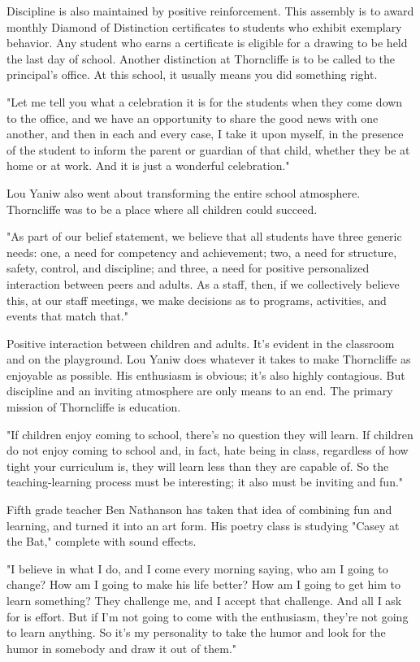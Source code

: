 Discipline is also maintained by positive reinforcement. This assembly is to award monthly Diamond of Distinction certificates to students who exhibit exemplary behavior. Any student who earns a certificate is eligible for a drawing to be held the last day of school. Another distinction at Thorncliffe is to be called to the principal's office. At this school, it usually means you did something right.

"Let me tell you what a celebration it is for the students when they come down to the office, and we have an opportunity to share the good news with one another, and then in each and every case, I take it upon myself, in the presence of the student to inform the parent or guardian of that child, whether they be at home or at work. And it is just a wonderful celebration."

Lou Yaniw also went about transforming the entire school atmosphere. Thorncliffe was to be a place where all children could succeed.

"As part of our belief statement, we believe that all students have three generic needs: one, a need for competency and achievement; two, a need for structure, safety, control, and discipline; and three, a need for positive personalized interaction between peers and adults. As a staff, then, if we collectively believe this, at our staff meetings, we make decisions as to programs, activities, and events that match that."

Positive interaction between children and adults. It's evident in the classroom and on the playground. Lou Yaniw does whatever it takes to make Thorncliffe as enjoyable as possible. His enthusiasm is obvious; it's also highly contagious. But discipline and an inviting atmosphere are only means to an end. The primary mission of Thorncliffe is education.

"If children enjoy coming to school, there's no question they will learn. If children do not enjoy coming to school and, in fact, hate being in class, regardless of how tight your curriculum is, they will learn less than they are capable of. So the teaching-learning process must be interesting; it also must be inviting and fun."

Fifth grade teacher Ben Nathanson has taken that idea of combining fun and learning, and turned it into an art form. His poetry class is studying "Casey at the Bat," complete with sound effects.

"I believe in what I do, and I come every morning saying, who am I going to change? How am I going to make his life better? How am I going to get him to learn something? They challenge me, and I accept that challenge. And all I ask for is effort. But if I'm not going to come with the enthusiasm, they're not going to learn anything. So it's my personality to take the humor and look for the humor in somebody and draw it out of them."

